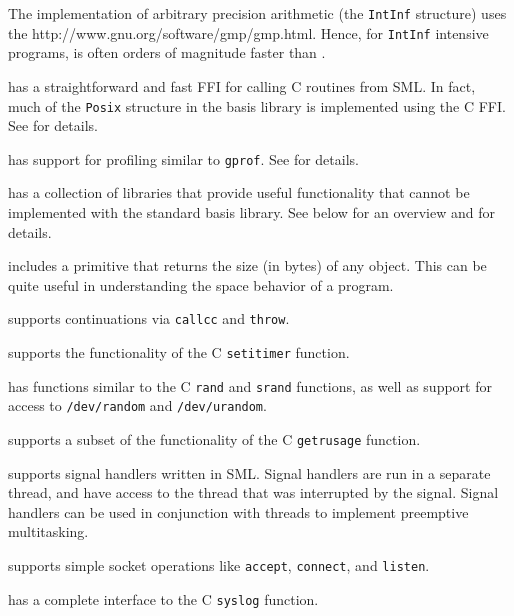 \begin{description}
The {\mlton} implementation of arbitrary precision arithmetic (the
{\tt IntInf} structure) uses the
		  {http://www.gnu.org/software/gmp/gmp.html}.
Hence, for {\tt IntInf} intensive programs, {\mlton} is often orders
of magnitude faster than {\smlnj}.

{\mlton} has a straightforward and fast FFI for calling C routines
from SML.  In fact, much of the {\tt Posix} structure in the basis library is
implemented using the C FFI.
See  for details.

{\mlton} has support for profiling similar to {\tt gprof}.  See
 for details.

{\mlton} has a collection of libraries that provide useful functionality that
cannot be implemented with the standard basis library.  See below for an
overview and  for details.

\begin{description}

{\mlton} includes a primitive that returns the size (in bytes) of any
object.  This can be quite useful in understanding the space behavior
of a program.

{\mlton} supports continuations via {\tt callcc} and {\tt throw}.

{\mlton} supports the functionality of the C {\tt setitimer} function.

{\mlton} has functions similar to the C {\tt rand} and {\tt srand} functions, as
well as support for access to {\tt /dev/random} and {\tt /dev/urandom}.

{\mlton} supports a subset of the functionality of the C {\tt getrusage}
function.

{\mlton} supports signal handlers written in SML.  Signal handlers are 
run in a separate thread, and have access to the thread that was
interrupted by the signal.  Signal handlers can be used in conjunction with
threads to implement preemptive multitasking.

{\mlton} supports simple socket operations like {\tt accept}, 
{\tt connect}, and {\tt listen}.

{\mlton} has a complete interface to the C {\tt syslog} function.


\end{description}
\end{description}
